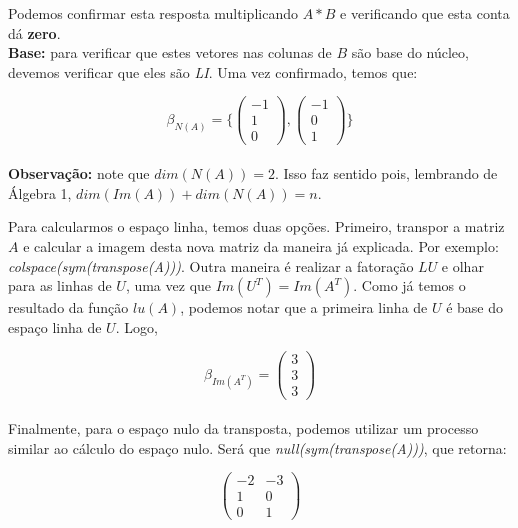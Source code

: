 \documentclass[12pt]{article}
\begin{document}
Podemos confirmar esta resposta multiplicando $A*B$ e verificando que esta conta dá \textbf{zero}. \\

\textbf{Base:} para verificar que estes vetores nas colunas de $B$ são base do núcleo, devemos verificar que eles são \textit{LI}. Uma vez confirmado, temos que:

\begin{equation*}
	\beta_{N(A)}= \{
	\begin{pmatrix}
		-1\\
		1\\
		0
	\end{pmatrix},
	\begin{pmatrix}
		-1\\
		0\\
		1
	\end{pmatrix}	\}
\end{equation*}\\

\textbf{Observação:} note que $dim(N(A))=2$. Isso faz sentido pois, lembrando de Álgebra 1, $dim(Im(A))+dim(N(A))=n$.

Para calcularmos o espaço linha, temos duas opções. Primeiro, transpor a matriz $A$ e calcular a imagem desta nova matriz da maneira já explicada. Por exemplo: \textit{colspace(sym(transpose(A)))}. Outra maneira é realizar a fatoração $LU$ e olhar para as linhas de $U$, uma vez que $Im(U^T)=Im(A^T)$. Como já temos o resultado da função $lu(A)$, podemos notar que a primeira linha de $U$ é base do espaço linha de $U$. Logo,

\begin{equation*}
	\beta_{Im(A^T)}= 
	\begin{pmatrix}
		3\\
		3\\
		3
	\end{pmatrix}	
\end{equation*}\\

Finalmente, para o espaço nulo da transposta, podemos utilizar um processo similar ao cálculo do espaço nulo. Será que \textit{null(sym(transpose(A)))}, que retorna:

\begin{equation*}
	\begin{pmatrix}
		-2 & -3\\
		1 & 0\\
		0 & 1
	\end{pmatrix}	
\end{equation*}\\
\end{document}
